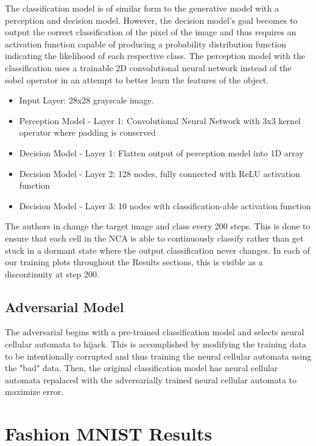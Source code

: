 \documentclass[conference]{IEEEtran}
\begin{document}
The classification model is of similar form to the generative model with a perception and decision model. However, the decision model's goal becomes to output the correct classification of the pixel of the image and thus requires an activation function capable of producing a probability distribution function indicating the likelihood of each respective class. The perception model with the classification uses a trainable 2D convolutional neural network instead of the sobel operator in an attempt to better learn the features of the object.

\begin{itemize}
    \item Input Layer: 28x28 grayscale image.
    \item Perception Model - Layer 1: Convolutional Neural Network with 3x3 kernel operator where padding is conserved
    \item Decision Model - Layer 1: Flatten output of perception model into 1D array
    \item Decision Model - Layer 2: 128 nodes, fully connected with ReLU activation function
    \item Decision Model - Layer 3: 10 nodes with classification-able activation function 
\end{itemize}

The authors in \cite{self-classify} change the target image and class every 200 steps. This is done to ensure that each cell in the NCA is able to continuously classify rather than get stuck in a dormant state where the output classification never changes. In each of our training plots throughout the Results sections, this is visible as a discontinuity at step 200.

\subsection{Adversarial Model} 

The adversarial begins with a pre-trained classification model and selects neural cellular automata to hijack. This is accomplished by modifying the training data to be intentionally corrupted and thus training the neural cellular automata using the "bad" data. Then, the original classification model has neural cellular automata repalaced with the adversarially trained neural cellular automata to maximize error. 

\section{Fashion MNIST Results}
\end{document}

